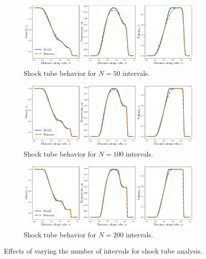 \begin{enumerate}[label=\alph*., start = 2]
    \pagebreak
    \begin{figure}[h!]
        \centering
        \begin{subfigure}[h]{\linewidth}
            \centering
            \includegraphics[width = \linewidth]{q2/n50.pdf}
            \caption{Shock tube behavior for $N = 50$ intervals.}
            \label{fig:q2_n50}
        \end{subfigure}
        \begin{subfigure}[h]{\linewidth}
            \centering
            \includegraphics[width = \linewidth]{q2/n100.pdf}
            \caption{Shock tube behavior for $N = 100$ intervals.}
            \label{fig:q2_n100}
        \end{subfigure}
        \begin{subfigure}[h]{\linewidth}
            \centering
            \includegraphics[width = \linewidth]{q2/n200.pdf}
            \caption{Shock tube behavior for $N = 200$ intervals.}
            \label{fig:q2_n200}
        \end{subfigure}
        \caption{Effects of varying the number of intervals for shock tube analysis.}
        \label{q2:shock_tube_analysis}
    \end{figure}

\end{enumerate}